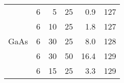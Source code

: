 \begin{table}[phtb]
\begin{center}
\begin{tabular}{rrrrrr}
            \hline
                              & 6           & 5              & 25             & 0.9               & 127                        \\
                              & 6           & 10             & 25             & 1.8               & 127                        \\
            GaAs              & 6           & 30             & 25             & 8.0               & 128                        \\
                              & 6           & 30             & 50             & 16.4              & 129                        \\
                              & 6           & 15             & 25             & 3.3               & 129                        \\
            \hline
        \end{tabular}
    \end{center}
\end{table}
